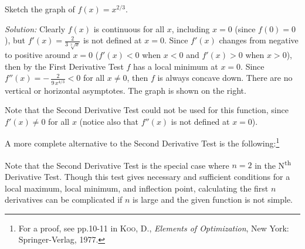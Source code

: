 \begin{exmp}\label{exmp:graph3}
\parpic[r]{}
\noindent Sketch the graph of $f(x) = x^{2/3}$.\vspace{1mm}
\par\noindent\emph{Solution:} Clearly $f(x)$ is continuous for all $x$,
including $x=0$ (since $f(0)=0$), but $f'(x) = \frac{2}{3\,\sqrt[3]{x}}$ is not
defined at $x=0$. Since $f'(x)$ changes from negative to positive around $x=0$
($f'(x) < 0$ when $x < 0$ and $f'(x) > 0$ when $x > 0$), then by the First
Derivative Test $f$ has a local minimum at $x=0$. Since $f''(x) = -\,
\frac{2}{9\,x^{4/3}} < 0$ for all $x \ne 0$, then $f$ is always concave down.
There are no vertical or horizontal asymptotes. The graph is shown on the
right.\vspace{2mm}
\par\noindent Note that the Second Derivative Test could not be used for this
function, since $f'(x) \ne 0$ for all $x$ (notice also that $f''(x)$ is not
defined at $x=0$).
\end{exmp}
\divider
\vspace{3mm}

A more complete alternative to the Second Derivative Test is the
following:\footnote{For a proof, see pp.10-11 in
\textsc{Koo, D.}, \emph{Elements of Optimization}, New York: Springer-Verlag,
1977.}

Note that the Second Derivative Test is the special case where $n=2$ in the
N\textsuperscript{th} Derivative Test. Though this test gives necessary
and sufficient conditions for a local maximum, local minimum, and inflection
point, calculating the first $n$ derivatives can be complicated if $n$ is large
and the given function is not simple.

